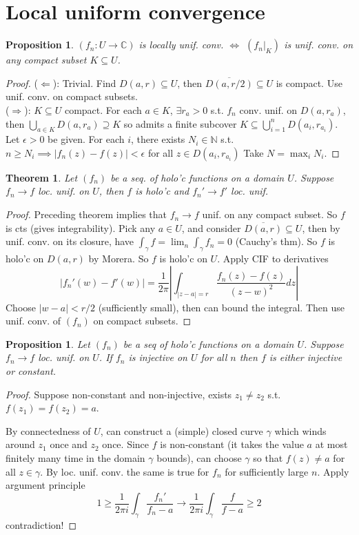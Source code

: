 \documentclass{article}
\theoremstyle{definition}
\theoremstyle{remark}
\theoremstyle{plain}
\newtheorem{thm}[defn]{Theorem}
\newtheorem{prop}[defn]{Proposition}
\newcommand{\NN}{\mathbb{N}}
\newcommand{\CC}{\mathbb{C}}
\begin{document}
\section{Local uniform convergence}
\begin{prop}
    $(f_n:U\to\CC)$ is locally unif. conv. $\Leftrightarrow$ $(f_n|_K)$ is unif. conv. on any compact subset $K\subseteq U$.
\end{prop}
\begin{proof}
    ($\Leftarrow$): Trivial. Find $D(a,r)\subseteq U$, then $\overline{D(a,r/2)}\subseteq U$ is compact. Use unif. conv. on compact subsets.\\
    ($\Rightarrow$): $K\subseteq U$ compact. For each $a\in K$, $\exists r_a>0$ s.t. $f_n$ conv. unif. on $D(a,r_a)$, then $\bigcup_{a\in K}D(a,r_a)\supseteq K$ so admits a finite subcover $K\subseteq \bigcup_{i=1}^nD(a_i,r_{a_i})$. Let $\epsilon>0$ be given. For each $i$, there exists $N_i\in \NN$ s.t. $n\ge N_i\implies |f_n(z)-f(z)|<\epsilon$ for all $z\in D(a_i,r_{a_i})$ Take $N=\max_i N_i$.
\end{proof}
\begin{thm}
    Let $(f_n)$ be a seq. of holo'c functions on a domain $U$. Suppose $f_n\to f$ loc. unif. on $U$, then $f$ is holo'c and $f_n'\to f'$ loc. unif.
\end{thm}
\begin{proof}
    Preceding theorem implies that $f_n\to f$ unif. on any compact subset. So $f$ is cts (gives integrability). Pick any $a\in U$, and consider $\overline{D(a,r)}\subseteq U$, then by unif. conv. on its closure, have $\int_\gamma f=\lim_n\int_\gamma f_n=0$ (Cauchy's thm). So $f$ is holo'c on $D(a,r)$ by Morera. So $f$ is holo'c on $U$. Apply CIF to derivatives
    \[|f_n'(w)-f'(w)|=\dfrac{1}{2\pi}\left|\int_{|z-a|=r}\dfrac{f_n(z)-f(z)}{(z-w)^2}dz\right|\]
    Choose $|w-a|<r/2$ (sufficiently small), then can bound the integral. Then use unif. conv. of $(f_n)$ on compact subsets.
\end{proof}
\begin{prop}
    Let $(f_n)$ be a seq of holo'c functions on a domain $U$. Suppose $f_n\to f$ loc. unif. on $U$. If $f_n$ is injective on $U$ for all $n$ then $f$ is either injective or constant.
\end{prop}
\begin{proof}
    Suppose non-constant and non-injective, exists $z_1\neq z_2$ s.t. $f(z_1)=f(z_2)=a$.

    By connectedness of $U$, can construct a (simple) closed curve $\gamma$ which winds around $z_1$ once and $z_2$ once. Since $f$ is non-constant (it takes the value $a$ at most finitely many time in the domain $\gamma$ bounds), can choose $\gamma$ so that $f(z)\neq a$ for all $z\in\gamma$. By loc. unif. conv. the same is true for $f_n$ for sufficiently large $n$. Apply argument principle
    \[1\ge\dfrac{1}{2\pi i}\int_\gamma\dfrac{f_n'}{f_n-a}\to\dfrac{1}{2\pi i}\int_\gamma \dfrac{f}{f-a}\ge 2\] contradiction!
\end{proof}
\end{document}
